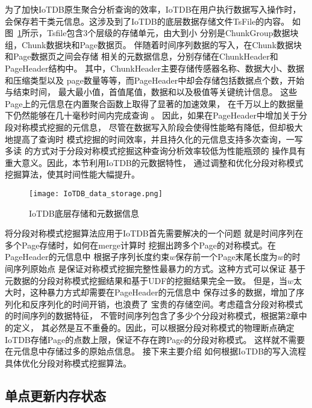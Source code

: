为了加快IoTDB原生聚合分析查询的效率，IoTDB在用户执行数据写入操作时，
会保存若干类元信息。这涉及到了IoTDB的底层数据存储文件TsFile的内容。
如图~\ref{fig:iotdb}所示，Tsfile包含3个层级的存储单元，由大到小
分别是ChunkGroup数据块组，Chunk数据块和Page数据页。
伴随着时间序列数据的写入，在Chunk数据块和Page数据页之间会存储
相关的元数据信息，分别存储在ChunkHeader和PageHeader结构中。
其中，ChunkHeader主要存储传感器名称、数据大小、数据和压缩类型以及
page数量等等，而PageHeader中却会存储包括数据点个数，开始与结束时间，
最大最小值，首值尾值，数据和以及极值等关键统计信息。
这些Page上的元信息在内置聚合函数上取得了显著的加速效果，
在千万以上的数据量下仍然能够在几十毫秒时间内完成查询
\cite{DBLP:conf/cikm/Huang0WZW16}。
因此，如果在PageHeader中增加关于分段对称模式挖掘的元信息，
尽管在数据写入阶段会使得性能略有降低，但却极大地提高了查询时
模式挖掘的时间效率，并且持久化的元信息支持多次查询，一写多读
的方式对于分段对称模式挖掘这种查询分析效率较低为性能瓶颈的
操作具有重大意义。因此，本节利用IoTDB的元数据特性，
通过调整和优化分段对称模式挖掘算法，使其时间性能大幅提升。
\begin{figure}
  \centering
  \texttt{[image: IoTDB\_data\_storage.png]}
  \caption{IoTDB底层存储和元数据信息}
  \label{fig:iotdb}
\end{figure}

将分段对称模式挖掘算法应用于IoTDB首先需要解决的一个问题
就是时间序列在多个Page存储时，如何在merge计算时
挖掘出跨多个Page的对称模式。在PageHeader的元信息中
根据子序列长度约束$w$保存前一个Page末尾长度为$w$的时间序列原始点
是保证对称模式挖掘完整性最暴力的方式。这种方式可以保证
基于元数据的分段对称模式挖掘结果和基于UDF的挖掘结果完全一致。
但是，当$w$太大时，这种暴力方式却需要在PageHeader的元信息中
保存过多的数据，增加了序列化和反序列化的时间开销，也浪费了
宝贵的存储空间。考虑蕴含分段对称模式的时间序列的数据特征，
不管时间序列包含了多少个分段对称模式，根据第2章中的定义，
其必然是互不重叠的。因此，可以根据分段对称模式的物理断点确定
IoTDB存储Page的点数上限，保证不存在跨Page的分段对称模式。
这样就不需要在元信息中存储过多的原始点信息。
接下来主要介绍
如何根据IoTDB的写入流程具体优化分段对称模式挖掘算法。


\subsection{单点更新内存状态}


